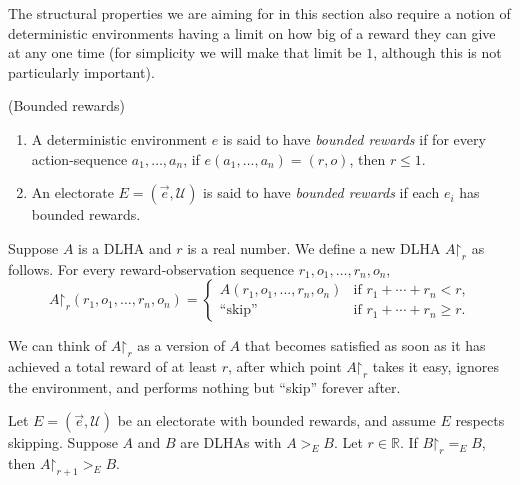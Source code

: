 \documentclass[twoside,11pt]{article}
\begin{document}
The structural properties we are aiming for in this section also require a notion
of deterministic environments having a limit on how big of a reward they can give at any one
time (for simplicity we will make that limit be $1$, although this is
not particularly important).

\begin{definition}
    (Bounded rewards)
    \begin{enumerate}
        \item
            A deterministic environment $e$ is said to have \emph{bounded rewards}
            if for every action-sequence $a_1,\ldots,a_n$,
            if $e(a_1,\ldots,a_n)=(r,o)$, then $r\leq 1$.
        \item
            An electorate $E=(\vec{e},\mathscr U)$ is said to have
            \emph{bounded rewards} if each $e_i$ has bounded rewards.
    \end{enumerate}
\end{definition}

\begin{definition}
Suppose $A$ is a DLHA and $r$ is a real number.
We define a new DLHA $A\mathord{\restriction}_r$ as follows.
For every reward-observation sequence $r_1,o_1,\ldots,r_n,o_n$,
\[
A\mathord{\restriction}_r(r_1,o_1,\ldots,r_n,o_n)
=
\begin{cases}
    A(r_1,o_1,\ldots,r_n,o_n) & \mbox{if $r_1+\cdots+r_n<r$,}\\
    \mbox{``skip''} & \mbox{if $r_1+\cdots+r_n\geq r$.}
\end{cases}
\]
\end{definition}

We can think of $A\mathord{\restriction}_r$ as a version
of $A$ that becomes satisfied as soon as it
has achieved a total reward of at least $r$, after which
point $A\mathord{\restriction}_r$ takes it easy, ignores the environment,
and performs nothing but ``skip'' forever after.

\begin{proposition}
\label{quitterproposition}
Let $E=(\vec{e},\mathscr U)$ be an electorate with bounded rewards, and assume
$E$ respects skipping.
Suppose $A$ and $B$ are DLHAs with $A>_{E}B$. Let $r\in\mathbb R$.
If $B\mathord{\restriction}_r=_{E}B$, then $A\mathord{\restriction}_{r+1}>_{E}B$.
\end{proposition}
\end{document}
